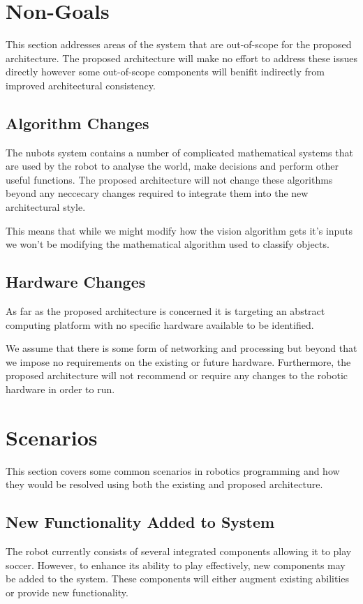 \documentclass[english,12pt]{scrartcl}
\begin{document}
	\section{Non-Goals}
		This section addresses areas of the system that are out-of-scope for the proposed architecture.
		The proposed architecture will make no effort to address these issues directly however some out-of-scope
		components will benifit indirectly from improved architectural consistency.
		
		\subsection{Algorithm Changes}
			The \gls{nubots} system contains a number of complicated mathematical systems that are used by the robot
			to analyse the world, make decisions and perform other useful functions. 
			The proposed architecture will not change these algorithms beyond any neccecary changes required to
			integrate them into the new architectural style.
			
			This means that while we might modify how the vision algorithm gets it's inputs we won't be modifying the
			mathematical algorithm used to classify objects.

		\subsection{Hardware Changes}
			As far as the proposed architecture is concerned it is targeting an abstract computing platform with no specific hardware
			available to be identified. 
			
			We assume that there is some form of networking and processing but beyond that we impose no requirements on the
			existing or future hardware. Furthermore, the proposed architecture will not recommend or require any changes to the robotic
			hardware in order to run.

	\section{Scenarios}
		This section covers some common scenarios in robotics programming and how they would be resolved 
		using both the existing and proposed architecture.

		\subsection{New Functionality Added to System}
			The robot currently consists of several integrated components allowing it to play soccer.
			However, to enhance its ability to play effectively, new components may be added to the system.
			These components will either augment existing abilities or provide new functionality.
\end{document}
